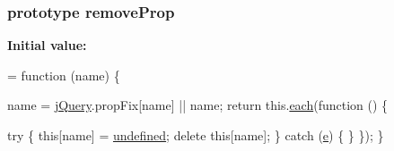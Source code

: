 \subsubsection[{\texorpdfstring{remove\+Prop}{removeProp}}]{ {\bf prototype} remove\+Prop}\hypertarget{jquery-2_82_81-vsdoc_8js_a5f3c3bda90c5d61345bf87ec3eac6145}{}\label{jquery-2_82_81-vsdoc_8js_a5f3c3bda90c5d61345bf87ec3eac6145}
{\bfseries Initial value\+:}
\begin{DoxyCode}
= \textcolor{keyword}{function} (name) \{
        

        name = \hyperlink{jquery-2_82_81-vsdoc_8js_add5237586d970a38a81f990e8eb28c6c}{jQuery}.propFix[name] || name;
        \textcolor{keywordflow}{return} this.\hyperlink{jquery-2_82_81-vsdoc_8js_a77da68323b96573f900f8b5dd3a47954}{each}(\textcolor{keyword}{function} () \{
            
            \textcolor{keywordflow}{try} \{
                \textcolor{keyword}{this}[name] = \hyperlink{jquery-2_82_81-vsdoc_8js_a08113a236cc18d2a9d5ce27e638012be}{undefined};
                \textcolor{keyword}{delete} \textcolor{keyword}{this}[name];
            \} \textcolor{keywordflow}{catch} (\hyperlink{packages_2bootstrap_83_83_86_2content_2_scripts_2bootstrap_8min_8js_ab5902775854a8b8440bcd25e0fe1c120}{e}) \{ \}
        \});
    \}
\end{DoxyCode}
